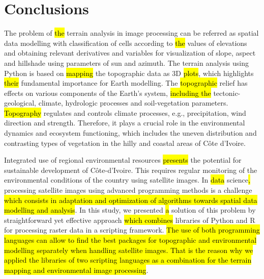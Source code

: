 \documentclass[jimaging,article,submit,pdftex,moreauthors]{Definitions/mdpi}
\begin{document}
\section{Conclusions}
The problem of \hl{the} terrain analysis in image processing can be referred as spatial data modelling with classification of cells according to \hl{the} values of elevations and obtaining relevant derivatives and variables for visualization of slope, aspect and hillshade using parameters of sun and azimuth. The terrain analysis using Python is based on \hl{mapping} the topographic data as 3D \hl{plots}, which highlights \hl{their} fundamental importance\hl{ }for Earth modelling. The \hl{topographic} relief has effects on various components of the Earth’s system, \hl{including the} tectonic-geological, climate, hydrologic processes and soil-vegetation parameters. \hl{Topography} regulates and controls climate processes, e.g., precipitation, wind direction and strength. Therefore, it plays a crucial role in the environmental dynamics and ecosystem functioning, which includes the uneven distribution and contrasting types of vegetation in the hilly and coastal areas of Côte d'Ivoire. 

Integrated\hl{ }use of regional environmental resources \hl{presents} the potential for sustainable development of Côte-d'Ivoire. This requires regular monitoring of the environmental conditions of the country using satellite images. In \hl{data} science\hl{, }processing satellite images using advanced programming methods is a challenge \hl{which consists in adaptation and optimization of algorithms towards spatial data modelling and analysis}. In this study, we presented \hl{a} solution of this problem by\hl{ }straightforward yet effective approach \hl{which combines} libraries of Python and R\hl{ }for processing\hl{ }raster data in a scripting framework. \hl{The use of both programming languages can allow to find the best packages for topographic and environmental modelling separately when handling satellite images. That is the reason why we applied the libraries of two scripting languages as a combination for the terrain mapping and environmental image processing}. 
\end{document}
